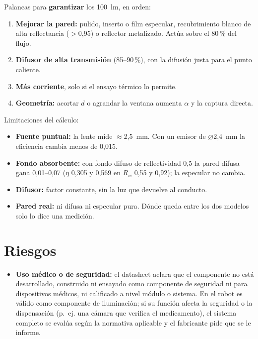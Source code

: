 \documentclass[11pt,a4paper]{article}
\begin{document}
Palancas para \textbf{garantizar} los 100~lm, en orden:
\begin{enumerate}
  \item \textbf{Mejorar la pared:} pulido, inserto o film especular, recubrimiento blanco de alta reflectancia
        ($>$0,95) o reflector metalizado. Actúa sobre el 80\,\% del flujo.
  \item \textbf{Difusor de alta transmisión} (85--90\,\%), con la difusión justa para el punto caliente.
  \item \textbf{Más corriente}, solo si el ensayo térmico lo permite.
  \item \textbf{Geometría:} acortar $d$ o agrandar la ventana aumenta $\alpha$ y la captura directa.
\end{enumerate}

Limitaciones del cálculo:
\begin{itemize}
  \item \textbf{Fuente puntual:} la lente mide $\approx$2,5~mm. Con un emisor de $\varnothing$2,4~mm la eficiencia
        cambia menos de 0,015.
  \item \textbf{Fondo absorbente:} con fondo difuso de reflectividad 0,5 la pared difusa gana 0,01--0,07
        ($\eta$ 0,305 y 0,569 en $R_w$ 0,55 y 0,92); la especular no cambia.
  \item \textbf{Difusor:} factor constante, sin la luz que devuelve al conducto.
  \item \textbf{Pared real:} ni difusa ni especular pura. Dónde queda entre los dos modelos solo lo dice una
        medición.
\end{itemize}

\section{Riesgos}
\begin{itemize}
  \item \textbf{Uso médico o de seguridad:} el datasheet aclara que el componente no está desarrollado, construido
        ni ensayado como componente de seguridad ni para dispositivos médicos, ni calificado a nivel módulo o
        sistema. En el robot es válido como componente de iluminación; si su función afecta la seguridad o la
        dispensación (p.~ej. una cámara que verifica el medicamento), el sistema completo se evalúa según la
        normativa aplicable y el fabricante pide que se le informe.
\end{itemize}
\end{document}
